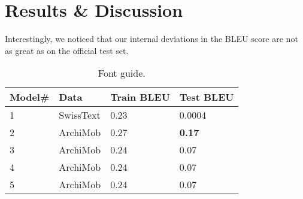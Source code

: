 \section{Results \& Discussion}

Interestingly, we noticed that our internal deviations in the BLEU score are not as great as on the official test set.

\begin{table}[H]
    \centering
    \begin{tabular}{llll}
    \hline\textbf{Model\#}    & \textbf{Data} & \textbf{Train BLEU}   & \textbf{Test BLEU} \\\hline   %
    1                   & SwissText     & 0.23                  & 0.0004                \\%
    2                   & ArchiMob      & 0.27                  & \textbf{0.17}         \\%
    3                   & ArchiMob      & 0.24                  & 0.07                  \\%
    4                   & ArchiMob      & 0.24                  & 0.07                  \\%
    5                   & ArchiMob      & 0.24                  & 0.07                  \\%
    \hline
    \end{tabular}
    \caption{\label{font-table} Font guide. }
\end{table}

